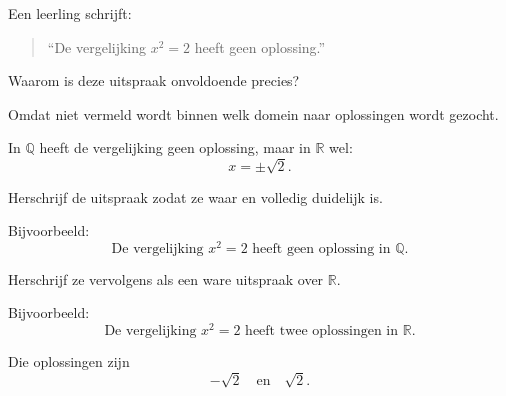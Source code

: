 \documentclass{ximera}
\begin{document}
\begin{oefening}{\oefU \ESS}

Een leerling schrijft:

\begin{quote}
``De vergelijking $x^2=2$ heeft geen oplossing.''
\end{quote}

\begin{question}
Waarom is deze uitspraak onvoldoende precies?

\begin{oplossing}
Omdat niet vermeld wordt binnen welk domein naar oplossingen wordt
gezocht.

In $\mathbb{Q}$ heeft de vergelijking geen oplossing, maar in
$\mathbb{R}$ wel:
\[
x=\pm\sqrt{2}.
\]
\end{oplossing}
\end{question}


\begin{question}
Herschrijf de uitspraak zodat ze waar en volledig duidelijk is.

\begin{oplossing}
Bijvoorbeeld:
\[
\text{De vergelijking }x^2=2\text{ heeft geen oplossing in }\mathbb{Q}.
\]
\end{oplossing}
\end{question}


\begin{question}
Herschrijf ze vervolgens als een ware uitspraak over $\mathbb{R}$.

\begin{oplossing}
Bijvoorbeeld:
\[
\text{De vergelijking }x^2=2\text{ heeft twee oplossingen in }
\mathbb{R}.
\]

Die oplossingen zijn
\[
-\sqrt{2}\quad\text{en}\quad\sqrt{2}.
\]
\end{oplossing}
\end{question}

\end{oefening}
\end{document}
